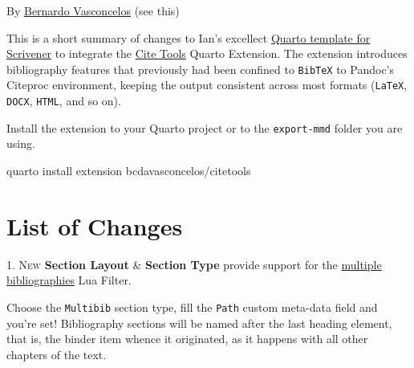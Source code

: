 \documentclass[
  12pt,
  a4paper,
  oneside]{scrbook}
\begin{document}
\protect\hypertarget{scriv27}{}{}

By \href{https://github.com/bcdavasconcelos}{Bernardo Vasconcelos} (see
this)

This is a short summary of changes to Ian's excellect
\href{http://forum.literatureandlatte.com/t/scrivener-quarto-a-technical-academic-publishing-workflow/129769?u=bernardo_vasconcelos}{Quarto
template for Scrivener} to integrate the
\href{http://bcdavasconcelos.github.io/citetools/}{Cite Tools} Quarto
Extension. The extension introduces bibliography features that
previously had been confined to \texttt{BibTeX} to Pandoc's Citeproc
environment, keeping the output consistent across most formats
(\texttt{LaTeX}, \texttt{DOCX}, \texttt{HTML}, and so on).

Install the extension to your Quarto project or to the
\texttt{export-mmd} folder you are using.

quarto install extension bcdavasconcelos/citetools

\hypertarget{list-of-changes}{%
\section{List of Changes}\label{list-of-changes}}

\protect\hypertarget{scriv28}{}{}

\textsc{1. New} \textbf{Section Layout} \& \textbf{Section Type} provide
support for the
\href{https://github.com/pandoc/lua-filters/tree/master/multiple-bibliographies}{multiple
bibliographies} Lua Filter.

\begin{tcolorbox}[enhanced jigsaw, titlerule=0mm, colframe=quarto-callout-tip-color-frame, opacitybacktitle=0.6, colback=white, colbacktitle=quarto-callout-tip-color!10!white, opacityback=0, title=\textcolor{quarto-callout-tip-color}{\faLightbulb}\hspace{0.5em}{Tip}, toprule=.15mm, left=2mm, bottomtitle=1mm, rightrule=.15mm, bottomrule=.15mm, breakable, toptitle=1mm, leftrule=.75mm, arc=.35mm, coltitle=black]

Choose the \texttt{Multibib} section type, fill the \texttt{Path} custom
meta-data field and you're set! Bibliography sections will be named
after the last heading element, that is, the binder item whence it
originated, as it happens with all other chapters of the text.

\end{tcolorbox}
\end{document}
